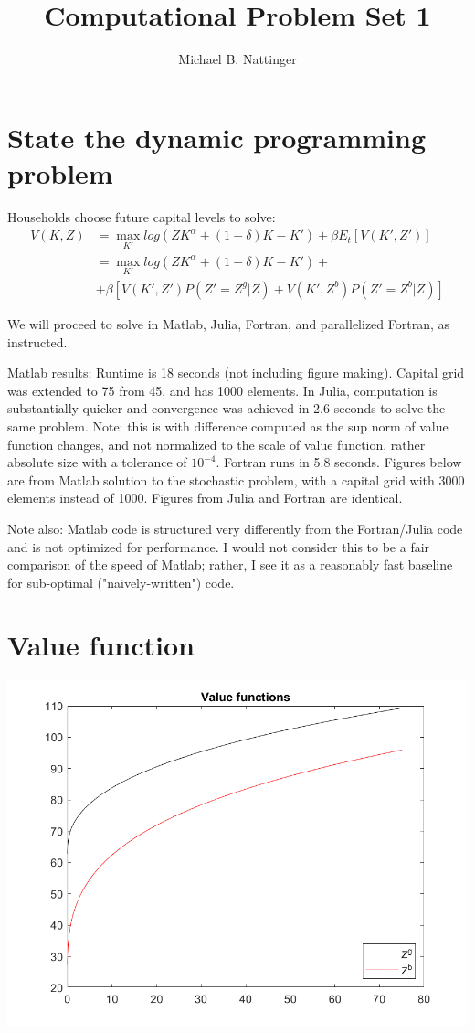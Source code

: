 \documentclass[11pt]{article} %
\title{Computational Problem Set 1}
\author{Michael B. Nattinger}
\begin{document}
\maketitle

\section{State the dynamic programming problem}
Households choose future capital levels to solve:
\begin{align*}
V(K,Z) &= \max_{K'} log(ZK^{\alpha} + (1-\delta)K - K') + \beta E_t[V(K',Z')]\\
&=  \max_{K'} log(ZK^{\alpha} + (1-\delta)K - K') + \\ &+ \beta[V(K',Z')P(Z' = Z^g|Z) + V(K',Z^b)P(Z' = Z^b|Z)]
\end{align*}

We will proceed to solve in Matlab, Julia, Fortran, and parallelized Fortran, as instructed.

Matlab results: Runtime is 18 seconds (not including figure making). Capital grid was extended to 75 from 45, and has 1000 elements. In Julia, computation is substantially quicker and convergence was achieved in 2.6 seconds to solve the same problem. Note: this is with difference computed as the sup norm of value function changes, and not normalized to the scale of value function, rather absolute size with a tolerance of $10^{-4}$. Fortran runs in 5.8 seconds. Figures below are from Matlab solution to the stochastic problem, with a capital grid with 3000 elements instead of 1000. Figures from Julia and Fortran are identical.

Note also: Matlab code is structured very differently from the Fortran/Julia code and is not optimized for performance. I would not consider  this to be a fair comparison of the speed of Matlab; rather,  I see it as a reasonably fast baseline for sub-optimal ("naively-written") code.

\section{Value function}
\includegraphics{value}
\end{document}
